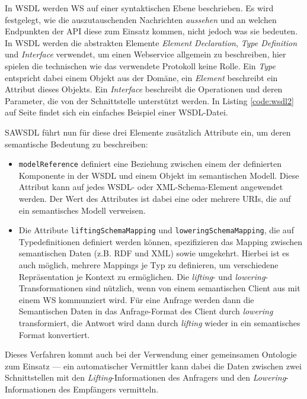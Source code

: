 In \ac{WSDL} werden \acl{WS} auf einer syntaktischen Ebene beschrieben. Es wird festgelegt, wie die auszutauschenden Nachrichten \emph{aussehen} und an welchen Endpunkten der \ac{API} diese zum Einsatz kommen, nicht jedoch was sie bedeuten. In \ac{WSDL} werden die abstrakten Elemente \emph{Element Declaration}, \emph{Type Definition} und \emph{Interface} verwendet, um einen Webservice allgemein zu beschreiben, hier spielen die technischen wie das verwendete Protokoll keine Rolle. Ein \emph{Type} entspricht dabei einem Objekt aus der Domäne, ein \emph{Element} beschreibt ein Attribut dieses Objekts. Ein \emph{Interface} beschreibt die Operationen und deren Parameter, die von der Schnittstelle unterstützt werden. In Listing \ref{code:wsdl2} auf Seite \pageref{code:wsdl2} findet sich ein einfaches Beispiel einer \ac{WSDL}-Datei.

\ac{SAWSDL} führt nun für diese drei Elemente zusätzlich Attribute ein, um deren semantische Bedeutung zu beschreiben:

\begin{itemize}
\item \texttt{modelReference} definiert eine Beziehung zwischen einem der definierten Komponente in der \ac{WSDL} und einem Objekt im semantischen Modell. Diese Attribut kann auf jedes \ac{WSDL}- oder XML-Schema-Element angewendet werden. Der Wert des Attributes ist dabei eine oder mehrere URIs, die auf ein semantisches Modell verweisen.
\item Die Attribute \texttt{liftingSchemaMapping} und \texttt{loweringSchemaMapping}, die auf Typedefinitionen definiert werden können, spezifizieren das Mapping zwischen semantischen Daten (z.B. \ac{RDF} und XML) sowie umgekehrt. Hierbei ist es auch möglich, mehrere Mappings je Typ zu definieren, um verschiedene Repräsentation je Kontext zu ermöglichen. Die \emph{lifting}- und \emph{lowering}-Transformationen sind nützlich, wenn von einem semantischen Client aus mit einem \acl{WS} kommunziert wird. Für eine Anfrage werden dann die Semantischen Daten in das Anfrage-Format des Client durch \emph{lowering} transformiert, die Antwort wird dann durch \emph{lifting} wieder in ein semantisches Format konvertiert.
\end{itemize}\cite[S.62ff]{ky-sawsdl}


Dieses Verfahren kommt auch bei der Verwendung einer gemeinsamen Ontologie zum Einsatz --- ein automatischer Vermittler kann dabei die Daten zwischen zwei Schnittstellen mit den \emph{Lifting}-Informationen des Anfragers und den \emph{Lowering}-Informationen des Empfängers vermitteln.

